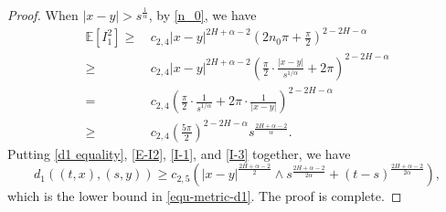 \documentclass[11pt,reqno]{amsart}
\numberwithin{equation}{section}
\def\EE{\mathbb{E}}
\newcommand{\1}{{\bf 1}}
\newcommand{\2}{{\bf 2}}
\newcommand{\lc}{\left(}
\newcommand{\rc}{\right)}
\begin{document}
\begin{proof}
 When $|x-y|>s^{\frac{1}{\alpha}}$, by
 \eqref{n_0}, we have
\begin{equation}\label{I-3}
\begin{split}
  \EE\left[I_1^2\right] \ge &\,  c_{2,4} |x-y|^{2H+\alpha-2}{\lc2n_0\pi+\frac{\pi}{2}\rc}^{2-2H-\alpha}\\
   \geq&\, c_{2,4}
   |x-y|^{2H+\alpha-2}{\lc\frac{\pi}{2}\cdot\frac{|x-y|}{s^{1/\alpha}}+2\pi\rc}^{2-2H-\alpha}  \\
=&\, c_{2,4}\lc\frac{\pi}{2}\cdot\frac 1 {s^{1/\alpha}}+2\pi\cdot\frac 1 {|x-y|}\rc^{2-2H-\alpha} \\
\ge &\, c_{2,4} \lc\frac{5\pi}{2}\rc^{2-2H-\alpha}s^{\frac{2H+\alpha-2}{\alpha}}.
\end{split}
\end{equation}
Putting  \eqref{d1 equality}, \eqref{E-I2},  \eqref{I-1}, and \eqref{I-3} together, we have
\begin{equation*}
d_1 ((t,x), (s,y))
\ge  c_{2,5}\lc |x-y|^{\frac{2H+\alpha-2}{2}}\wedge s^{\frac{2H+\alpha-2}{2\alpha}}+(t-s)^{\frac{2H+\alpha-2}{2\alpha}}\rc,
\end{equation*}
which is the lower bound in  \eqref{equ-metric-d1}.
The proof is complete.
\end{proof}
\end{document}
